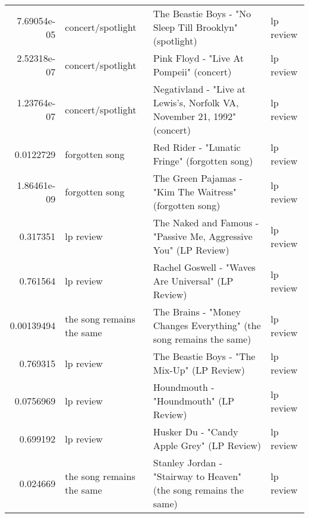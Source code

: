 \documentclass[letterpaper,10pt]{article}
\begin{document}
\begin{table}[H]
\begin{adjustbox}{max width=\linewidth}
\begin{tabular}{rlll}
  7.69054e-05 & concert/spotlight         & The Beastie Boys - "No Sleep Till Brooklyn" (spotlight)                                                      & lp review                 \\
  2.52318e-07 & concert/spotlight         & Pink Floyd - "Live At Pompeii" (concert)                                                                     & lp review                 \\
  1.23764e-07 & concert/spotlight         & Negativland - "Live at Lewis's, Norfolk VA, November 21, 1992" (concert)                                     & lp review                 \\
  0.0122729   & forgotten song            & Red Rider - "Lunatic Fringe" (forgotten song)                                                                & lp review                 \\
  1.86461e-09 & forgotten song            & The Green Pajamas - "Kim The Waitress" (forgotten song)                                                      & lp review                 \\
  0.317351    & lp review                 & The Naked and Famous - "Passive Me, Aggressive You" (LP Review)                                              & lp review                 \\
  0.761564    & lp review                 & Rachel Goswell - "Waves Are Universal" (LP Review)                                                           & lp review                 \\
  0.00139494  & the song remains the same & The Brains - "Money Changes Everything" (the song remains the same)                                          & lp review                 \\
  0.769315    & lp review                 & The Beastie Boys - "The Mix-Up" (LP Review)                                                                  & lp review                 \\
  0.0756969   & lp review                 & Houndmouth - "Houndmouth" (LP Review)                                                                        & lp review                 \\
  0.699192    & lp review                 & Husker Du - "Candy Apple Grey" (LP Review)                                                                   & lp review                 \\
  0.024669    & the song remains the same & Stanley Jordan - "Stairway to Heaven" (the song remains the same)                                            & lp review                 \\

\end{tabular}
\end{adjustbox}
\end{table}
\end{document}
